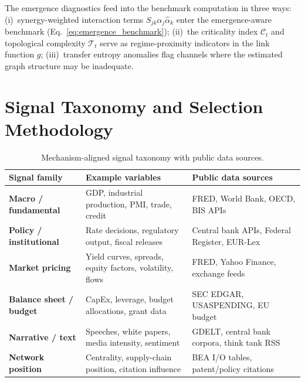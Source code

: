 \documentclass[11pt,a4paper]{article}
\theoremstyle{definition}
\begin{document}
The emergence diagnostics feed into the benchmark computation in three ways: (i)~synergy-weighted interaction terms $S_{jk}\hat{\alpha}_j\hat{\alpha}_k$ enter the emergence-aware benchmark (Eq.~\ref{eq:emergence_benchmark}); (ii)~the criticality index $\mathcal{C}_t$ and topological complexity $\mathcal{T}_t$ serve as regime-proximity indicators in the link function $g$; (iii)~transfer entropy anomalies flag channels where the estimated graph structure may be inadequate.


\section{Signal Taxonomy and Selection Methodology}
\label{sec:signals}

\begin{table}[H]
\centering\small
\begin{tabularx}{\textwidth}{@{}>{\bfseries}p{2.5cm}Xp{4.8cm}@{}}
\toprule
Signal family & Example variables & Public data sources \\
\midrule
Macro / fundamental & GDP, industrial production, PMI, trade, credit & FRED, World Bank, OECD, BIS APIs \\
Policy / institutional & Rate decisions, regulatory output, fiscal releases & Central bank APIs, Federal Register, EUR-Lex \\
Market pricing & Yield curves, spreads, equity factors, volatility, flows & FRED, Yahoo Finance, exchange feeds \\
Balance sheet / budget & CapEx, leverage, budget allocations, grant data & SEC EDGAR, USASPENDING, EU budget \\
Narrative / text & Speeches, white papers, media intensity, sentiment & GDELT, central bank corpora, think tank RSS \\
Network position & Centrality, supply-chain position, citation influence & BEA I/O tables, patent/policy citations \\
\bottomrule
\end{tabularx}
\caption{Mechanism-aligned signal taxonomy with public data sources.}
\label{tab:signals}
\end{table}
\end{document}
